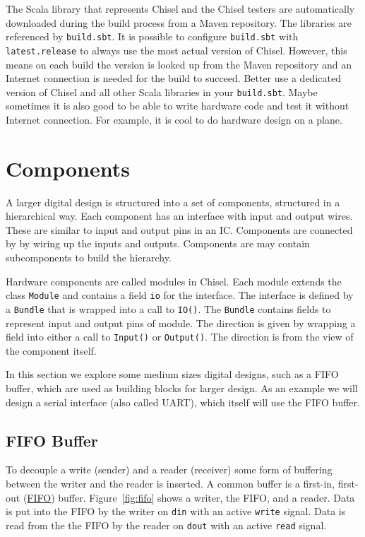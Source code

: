 \documentclass[%
    11pt, %
    headinclude, footexclude,
    openright, %
    notitlepage,
    cleardoubleempty,
    headsepline,
    pointlessnumbers,
    bibtotoc, idxtotoc,
    ]{scrbook}
\newcommand{\code}[1]{{\small{\texttt{#1}}}}
\begin{document}
The Scala library that represents Chisel and the Chisel testers are automatically
downloaded during the build process from a Maven repository.
The libraries are referenced by \code{build.sbt}. It is possible to configure \code{build.sbt}
with \code{latest.release} to always use the most actual version of Chisel.
However, this means on each build the version is looked up from the Maven
repository and an Internet connection is needed for the build to succeed.
Better use a dedicated version of Chisel and all other Scala libraries in your \code{build.sbt}.
Maybe sometimes it is also good to be able to write hardware code and test it without Internet connection.
For example, it is cool to do hardware design on a plane.

\chapter{Components}

A larger digital design is structured into a set of components, structured in
a hierarchical way. Each component has an interface with input and output
wires. These are similar to input and output pins in an IC.
Components are connected by by wiring up the inputs and outputs.
Components are may contain subcomponents to build the hierarchy.

Hardware components are called modules in Chisel. Each module extends
the class \code{Module} and contains a field \code{io} for the interface.
The interface is defined by a \code{Bundle} that is wrapped into a call to \code{IO()}.
The \code{Bundle} contains fields to represent input and output pins of
module. The direction is given by wrapping a field into either a call to \code{Input()}
or \code{Output()}. The direction is from the view of the component itself.

In this section we explore some medium sizes digital designs, such as
a FIFO buffer, which are used as building blocks for larger design.
As an example we will design a serial interface (also called UART),
which itself will use the FIFO buffer.

\section{FIFO Buffer}

To decouple a write (sender) and a reader (receiver) some form
of buffering between the writer and the reader is inserted.
A common buffer is a first-in, first-out
(\href{https://en.wikipedia.org/wiki/FIFO_%28computing_and_electronics%29}{FIFO})
buffer. Figure~\ref{fig:fifo} shows a writer, the FIFO, and a reader.
Data is put into the FIFO by the writer on \code{din} with an active
\code{write} signal. Data is read from the the FIFO by the reader on
\code{dout} with an active \code{read} signal.
\end{document}
